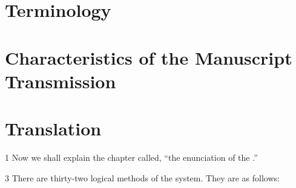 	


\section{Terminology}



\section{Characteristics of the Manuscript Transmission}


\section{Translation}

\begin{translation}

\item [1] Now we shall explain the chapter called, “the enunciation of the
.”

\item [3] There are thirty-two logical methods of the system. They are as 
follows: 
\smallskip



\end{translation}
